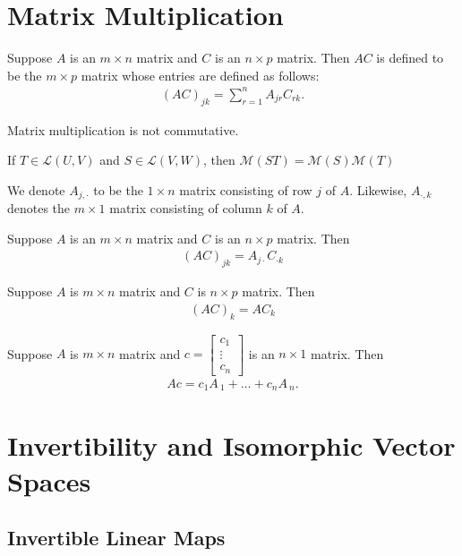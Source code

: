 \documentclass{memoir}
\begin{document}
\section{Matrix Multiplication}	
\begin{defn}
	Suppose $A$ is an $m\times n$ matrix and $C$ is an $n\times p$ matrix. Then $AC$ is defined to be the $m\times p$ matrix whose entries are defined as follows:
	\begin{align*}
		(AC)_{jk} = \sum_{r=1}^{n} A_{jr}C_{rk}.
	\end{align*}
\end{defn}	
Matrix multiplication is not commutative.

\begin{cor}
	If $T \in \mathcal{L}(U,V)$ and $S \in \mathcal{L}(V,W)$, then $\mathcal{M}(ST) = \mathcal{M}(S)\mathcal{M}(T)$
\end{cor}
We denote $A_{j,\cdot}$ to be the $1\times n$ matrix consisting of row $j$ of $A$. Likewise, $A_{\cdot ,k}$ denotes the $m\times 1$ matrix consisting of column $k$ of $A$.
\begin{cor}
	Suppose $A$ is an $m\times n$ matrix and $C$ is an $n\times p$ matrix. Then
	\begin{align*}
		(AC)_{jk} = A_{j\cdot }C_{\cdot k}
	\end{align*}
\end{cor}
\begin{cor}
	Suppose $A$ is $m\times n$ matrix and $C$ is $n\times p$ matrix. Then
	\begin{align*}
		(AC)_{k} = AC_{k}
	\end{align*}
\end{cor}
\begin{cor}
	Suppose $A$ is $m\times n$ matrix and $c = \begin{bmatrix} c_1 \\ \vdots \\ c_n \end{bmatrix} $ is an $n\times 1$ matrix. Then
	\begin{align*}
		Ac = c_1A_{~1} + \ldots + c_nA_{~n}.
	\end{align*}
\end{cor}

\section{Invertibility and Isomorphic Vector Spaces}
\label{cha:invertibility_and_isomorphic_vector_spaces}

\subsection{Invertible Linear Maps}
\label{sec:invertible_linear_maps}
\end{document}
